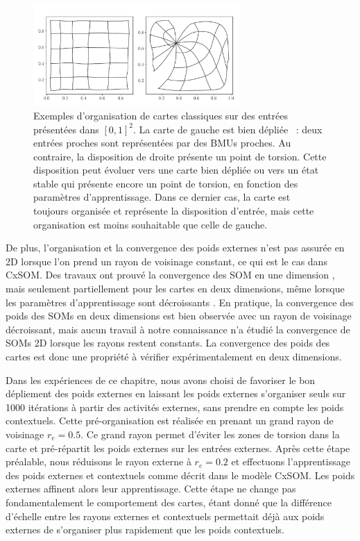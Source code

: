 \documentclass[../main]{subfiles}
\begin{document}
\begin{figure}
	\centering\includegraphics[width=0.7\textwidth]{grid_torsion.pdf}
	\caption{Exemples d'organisation de cartes classiques sur des entrées présentées dans $[0,1]^2$. 
	La carte de gauche est \og bien dépliée \fg{}~: deux entrées proches sont représentées par des BMUs proches. 
	Au contraire, la disposition de droite présente un point de torsion. Cette disposition peut évoluer vers une carte bien dépliée ou vers un état stable qui présente encore un point de torsion, en fonction des paramètres d'apprentissage. Dans ce dernier cas, la carte est toujours organisée et représente la disposition d'entrée, mais cette organisation est moins souhaitable que celle de gauche. \label{fig:torsion}
	}
\end{figure}

De plus, l'organisation et la convergence des poids externes n'est pas assurée en 2D lorsque l'on prend un rayon de voisinage constant, ce qui est le cas dans CxSOM.
Des travaux ont prouvé la convergence des SOM en une dimension \cite{cottrell_theoretical_2016}, mais seulement partiellement pour les cartes en deux dimensions, même lorsque les paramètres d'apprentissage sont décroissants \cite{flanagan_self-organisation_1996}. 
En pratique, la convergence des poids des SOMs en deux dimensions est bien observée avec un rayon de voisinage décroissant, mais aucun travail à notre connaissance n'a étudié la convergence de SOMs 2D lorsque les rayons restent constants. La convergence des poids des cartes est donc une propriété à vérifier expérimentalement en deux dimensions.

Dans les expériences de ce chapitre, nous avons choisi de favoriser le bon dépliement des poids externes en laissant les poids externes s'organiser seuls sur 1000 itérations à partir des activités externes, sans prendre en compte les poids contextuels. Cette pré-organisation est réalisée en prenant un grand rayon de voisinage $r_e = 0.5$. 
Ce grand rayon permet d'éviter les zones de torsion dans la carte et pré-répartit les poids externes sur les entrées externes. Après cette étape préalable, nous réduisons le rayon externe à $r_e = 0.2$ et effectuons l'apprentissage des poids externes et contextuels comme décrit dans le modèle CxSOM. Les poids externes affinent alors leur apprentissage. 
Cette étape ne change pas fondamentalement le comportement des cartes, étant donné que la différence d'échelle entre les rayons externes et contextuels permettait déjà aux poids externes de s'organiser plus rapidement que les poids contextuels.
\end{document}
